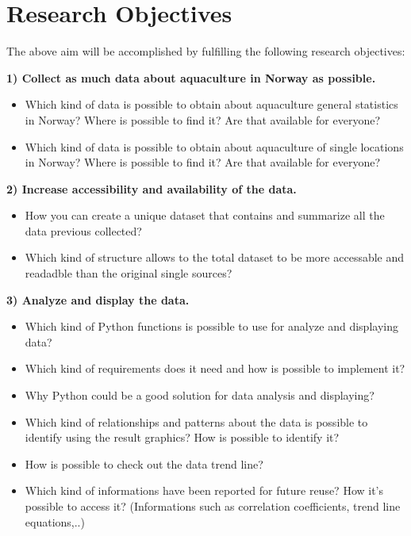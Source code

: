 \section{Research Objectives}
\vspace{-5mm}
The above aim will be accomplished by fulfilling the following research objectives:

\textbf{1) Collect as much data about aquaculture in Norway as possible.}
\vspace{-5mm}
\begin{itemize}
 \setlength{\itemsep}{-5pt}
  \item Which kind of data is possible to obtain about aquaculture general statistics in Norway? Where is possible to find it? Are that available for everyone?
  \item Which kind of data is possible to obtain about aquaculture of single locations in Norway? Where is possible to find it? Are that available for everyone?
\end{itemize}

 
\textbf{2) Increase accessibility and availability of the data.}
\vspace{-5mm}
\begin{itemize}
 \setlength{\itemsep}{-5pt}
  \item How you can create a unique dataset that contains and summarize all the data previous collected?
  \item Which kind of structure allows to the total dataset to be more accessable and readadble than the original single sources?
\end{itemize}
 
\textbf{3) Analyze and display the data.}
\vspace{-5mm}
\begin{itemize}
 \setlength{\itemsep}{-5pt}
  \item Which kind of Python functions is possible to use for analyze and displaying data? 
  \item Which kind of requirements does it need and how is possible to implement it?
  \item Why Python could be a good solution for data analysis and displaying? 
  \item Which kind of relationships and patterns about the data is possible to identify using the result graphics? How is possible to identify it?
  \item How is possible to check out the data trend line? 
  \item Which kind of informations have been reported for future reuse? How it's possible to access it? (Informations such as correlation coefficients, trend line equations,..)
 \end{itemize}

